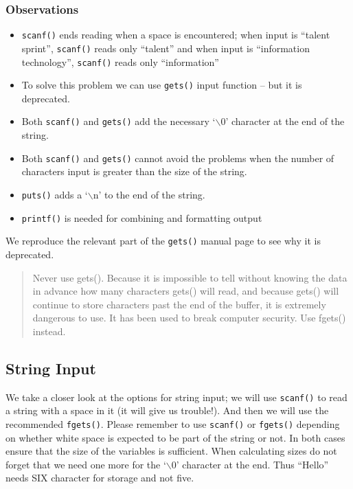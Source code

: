 \documentclass[11pt,a4paper]{article}
\begin{document}
\subsubsection*{Observations}
\begin{itemize}
\item \texttt{scanf()} ends reading when a space is encountered; when input is ``talent sprint'', \texttt{scanf()} reads only ``talent'' and when input is ``information technology'', \texttt{scanf()} reads only ``information''
\item To solve this problem we can use \texttt{gets()} input function -- but it is deprecated.
\item Both \texttt{scanf()} and \texttt{gets()} add the necessary `$\backslash$0' character at the end of the string.
\item Both \texttt{scanf()} and \texttt{gets()} cannot avoid the problems when the number of characters input is greater than the size of the string.
\item \texttt{puts()} adds a `$\backslash$n' to the end of the string. 
\item \texttt{printf()} is needed for combining and formatting output
\end{itemize}

We reproduce the relevant part of the \texttt{gets()} manual page to see why it is deprecated.

\begin{quote}
       Never use gets().  Because it is impossible to tell without knowing the data in advance how many characters gets() will read, and because gets() will continue to store characters past the end of the  buffer,  it  is  extremely  dangerous  to  use.  It has been used to break computer security.  Use fgets() instead.
\end{quote}

\subsection*{String Input}
We take a closer look at the options for string input; we will use \texttt{scanf()} to read a string with a space in it (it will give us trouble!). And then we will use the recommended \texttt{fgets()}. Please remember to use \texttt{scanf()} or \texttt{fgets()} depending on whether white space is expected to be part of the string or not. 
In both cases ensure that the size of the variables is sufficient. When calculating sizes do not forget that we need one more for the `$\backslash$0' character at the end. Thus ``Hello'' needs SIX character for storage and not five.
\end{document}
